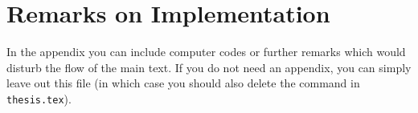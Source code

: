 

\chapter{Remarks on Implementation}
\label{Appendix-Implementation}

In the appendix you can include \eg computer codes or further remarks which would disturb the flow of the main text. If you do not need an appendix, you can simply leave out this file (in which case you should also delete the \verb|| command in \texttt{thesis.tex}).
		
